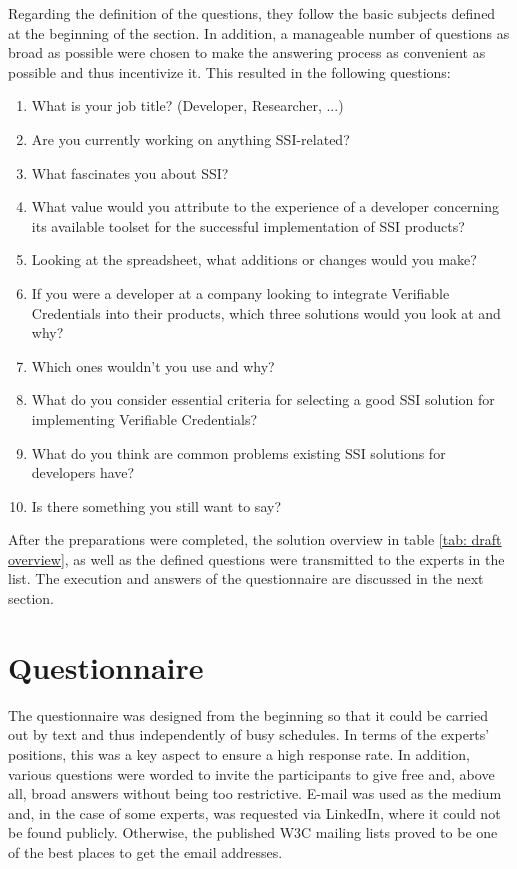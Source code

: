     Regarding the definition of the questions, they follow the basic subjects defined at the beginning of the section. In addition, a manageable number of questions as broad as possible were chosen to make the answering process as convenient as possible and thus incentivize it. This resulted in the following questions:
    
    \begin{enumerate}
        \item What is your job title? (Developer, Researcher, ...)		
        \item Are you currently working on  anything SSI-related?		
        \item What fascinates you about SSI?		
        \item What value would you attribute to the experience of a developer concerning its available toolset for the successful implementation of SSI products?		
        \item Looking at the spreadsheet, what additions or changes would you make?		
        \item If you were a developer at a company looking to integrate Verifiable Credentials into their products, which three solutions would you look at and why?		
        \item Which ones wouldn't you use and why?		
        \item What do you consider essential criteria for selecting a good SSI solution for implementing Verifiable Credentials?		
        \item What do you think are common problems existing SSI solutions for developers have? 
        \item Is there something you still want to say?
    \end{enumerate}

    After the preparations were completed, the solution overview in 
    table \ref{tab: draft overview}, as well as the defined questions were transmitted to the experts in the list. The execution and answers of the questionnaire are discussed in the next section.

	\section{Questionnaire}

	The questionnaire was designed from the beginning so that it could be carried out by text and thus independently of busy schedules. In terms of the experts' positions, this was a key aspect to ensure a high response rate. In addition, various questions were worded to invite the participants to give free and, above all, broad answers without being too restrictive. E-mail was used as the medium and, in the case of some experts, was requested via LinkedIn, where it could not be found publicly. Otherwise, the published W3C mailing lists proved to be one of the best places to get the email addresses.
	
